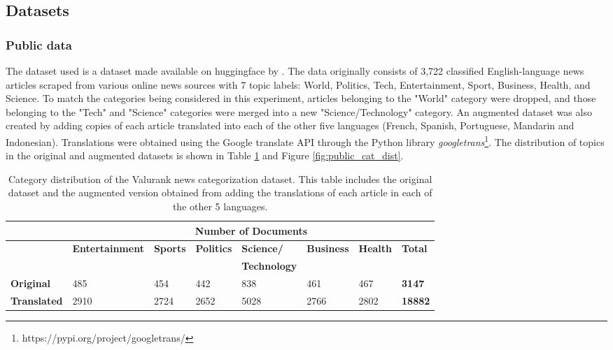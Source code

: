 \documentclass{l4proj}
\begin{document}
\subsection{Datasets}
\label{section:datasets}
\subsubsection{Public data} \hfill \par
The dataset used is a dataset made available on huggingface by \cite{valurankdata}. The data originally consists of 3,722 classified English-language news articles scraped from various online news sources with 7 topic labels: World, Politics, Tech, Entertainment, Sport, Business, Health, and Science. To match the categories being considered in this experiment, articles belonging to the "World" category were dropped, and those belonging to the "Tech" and "Science" categories were merged into a new "Science/Technology" category. An augmented dataset was also created by adding copies of each article translated into each of the other five languages (French, Spanish, Portuguese, Mandarin and Indonesian). Translations were obtained using the Google translate API through the Python library \emph{googletrans}\footnote{https://pypi.org/project/googletrans/}. The distribution of topics in the original and augmented datasets is shown in Table \ref{table:valurankstats} and Figure \ref{fig:public_cat_dist}.

\begin{table}[h]
\begin{tabular}{llllllll}
\hline
\multicolumn{1}{c}{\textbf{}} & \multicolumn{7}{c}{\textbf{Number of Documents}}                                                                                          \\ \hline
                              & \textbf{Entertainment} & \textbf{Sports} & \textbf{Politics} & \textbf{Science/}   & \textbf{Business} & \textbf{Health} & \textbf{Total} \\
                              & \textbf{}              &                 &                   & \textbf{Technology} & \textbf{}         & \textbf{}       &                \\ \hline
\textbf{Original}             & 485                    & 454             & 442               & 838                 & 461               & 467             & \textbf{3147}  \\
\textbf{Translated}           & 2910                   & 2724            & 2652              & 5028                & 2766              & 2802            & \textbf{18882} \\ \hline
\end{tabular}
\caption{Category distribution of the Valurank news categorization dataset. This table includes the original dataset and the augmented version obtained from adding the translations of each article in each of the other 5 languages.}
\label{table:valurankstats}
\end{table}
\end{document}

